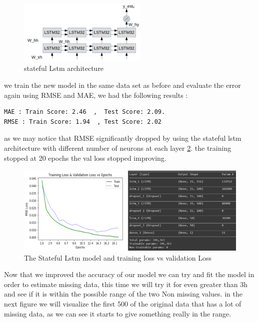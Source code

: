 \begin{figure}[h]
\centering
\includegraphics[width=0.55\textwidth]{img/stateful_stacked_lstm.png}  
\caption{stateful Lstm  architecture \cite{keras2015}}
\label{}
\end{figure}
we train the new model in the same data set as before and evaluate the error again using RMSE and MAE, we had the following results :
\begin{verbatim}
MAE : Train Score: 2.46  ,  Test Score: 2.09.
RMSE : Train Score: 1.94  , Test Score: 2.02 
\end{verbatim}
as we may notice that RMSE significantly dropped by using the stateful lstm architecture with different  number of neurons at each layer \ref{stat_lstm}. the training stopped at 20 epochs the val loss stopped improving.
\begin{figure}[!h]
\centering
\includegraphics[width=1.05\textwidth]{img/lstm_stateful.png}  
\caption{The Stateful Lstm model and training loss vs validation Loss }
\label{stat_lstm}
\end{figure}
Now that we improved the accuracy of our model we can try and fit the model in order to estimate missing data, this time we will try it for even greater than 3h and see if it is within the possible range of the two Non missing values.
in the next figure we will visualize the first 500 of the original data that has a lot of missing data, as we can see it starts to give something really in the range.

